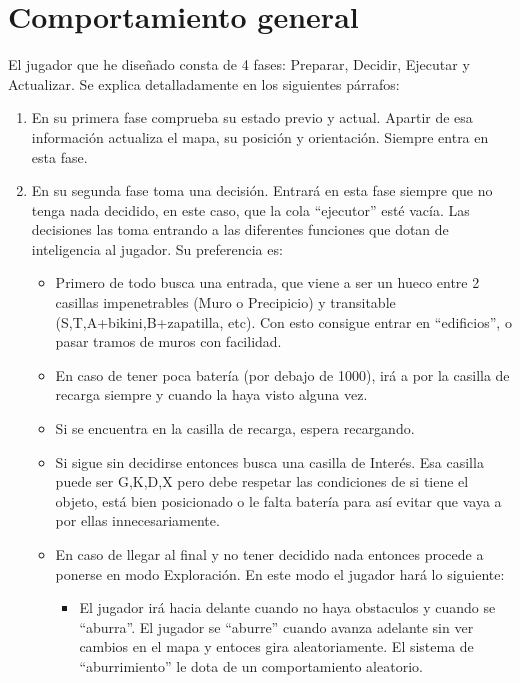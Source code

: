 \documentclass[12pt, spanish]{article}
\begin{document}
\section{Comportamiento general}
El jugador que he diseñado consta de 4 fases: Preparar, Decidir, Ejecutar y Actualizar. Se explica detalladamente en los siguientes párrafos:
\begin{enumerate}
 \item En su primera fase comprueba su estado previo y actual. Apartir de esa información actualiza el mapa, su posición y orientación. Siempre entra en esta fase.

 \item En su segunda fase toma una decisión. Entrará en esta fase siempre que no tenga nada decidido, en este caso, que la cola ``ejecutor'' esté vacía. Las decisiones las toma entrando a las diferentes funciones que dotan de inteligencia al jugador. Su preferencia es:
  \begin{itemize}
    \item Primero de todo busca una entrada, que viene a ser un hueco entre 2 casillas impenetrables (Muro o Precipicio) y transitable (S,T,A+bikini,B+zapatilla, etc). Con esto consigue entrar en ``edificios'', o pasar tramos de muros con facilidad.

    \item En caso de tener poca batería (por debajo de 1000), irá a por la casilla de recarga siempre y cuando la haya visto alguna vez.

    \item Si se encuentra en la casilla de recarga, espera recargando.

    \item Si sigue sin decidirse entonces busca una casilla de Interés. Esa casilla puede ser G,K,D,X pero debe respetar las condiciones de si tiene el objeto, está bien posicionado o le falta batería para así evitar que vaya a por ellas innecesariamente.

    \item En caso de llegar al final y no tener decidido nada entonces procede a ponerse en modo Exploración. En este modo el jugador hará lo siguiente:
      \begin{itemize}
      \item El jugador irá hacia delante cuando no haya obstaculos y cuando se ``aburra''. El jugador se ``aburre'' cuando avanza adelante sin ver cambios en el mapa y entoces gira aleatoriamente. El sistema de ``aburrimiento'' le dota de un comportamiento aleatorio.


\end{itemize}
\end{itemize}
\end{enumerate}
\end{document}
